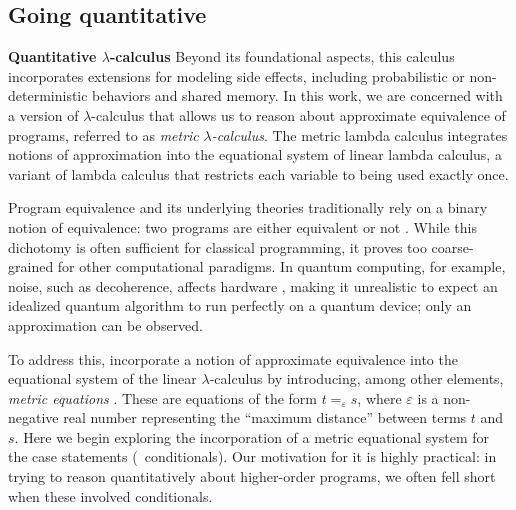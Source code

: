 



\subsection*{Going quantitative}

\textbf{Quantitative $\lambda$-calculus}
Beyond its foundational aspects, this calculus incorporates extensions for modeling side effects, including probabilistic or non-deterministic behaviors and shared memory. In this work, we are concerned with a version of $\lambda$-calculus that allows us to reason about approximate equivalence of programs, referred to as \emph{metric }$\lambda$\emph{-calculus}. The metric lambda calculus integrates notions of
approximation into the equational system of linear lambda calculus, a variant of lambda calculus that restricts each variable to being used exactly once.

Program equivalence and its underlying theories traditionally rely on a binary notion of equivalence: two programs are either equivalent or not \cite{winskel93}. While this dichotomy is often sufficient for classical programming, it proves too coarse-grained for other computational paradigms. In quantum computing, for example, noise, such as decoherence, affects hardware \cite{watrous2018theory,nielsen2010quantum,preskill2018quantum}, making it unrealistic to expect an idealized quantum algorithm to run perfectly on a quantum device; only an approximation can be observed. 


To address this, \cite{dahlqvistInternalLanguage2022,dahlqvist2023syntactic} incorporate a notion of approximate equivalence into the equational system of the linear $\lambda$-calculus by introducing, among other elements, \emph{metric equations} \cite{mardare2016quantitative, mardare2017axiomatizability}. These are equations of the form $t =_{\varepsilon} s$, where $\varepsilon$ is a non-negative real number representing the ``maximum distance'' between terms $t$ and $s$. Here we begin exploring the incorporation of a metric equational system for the case statements (\ie\ conditionals). Our motivation for it is highly practical: in trying to reason quantitatively about higher-order programs, we often fell short when these involved conditionals.

